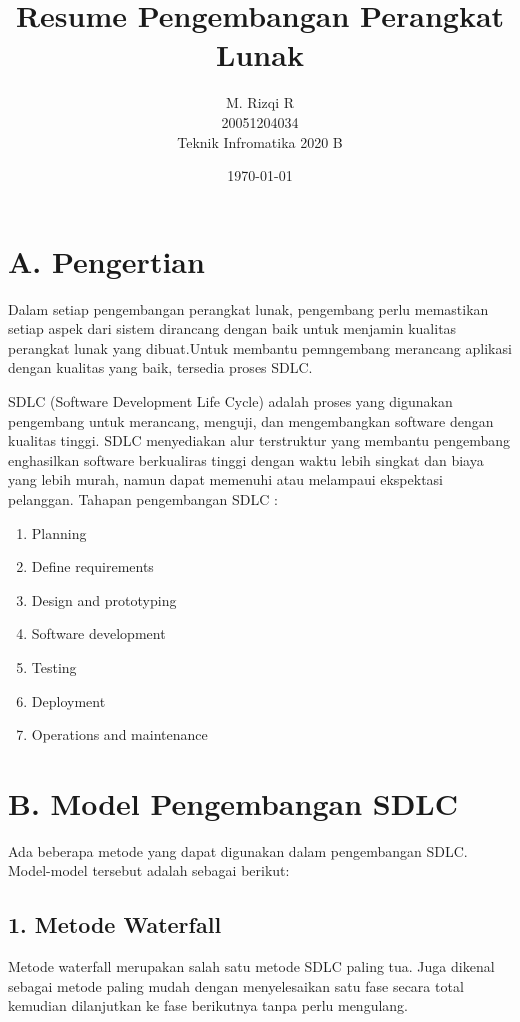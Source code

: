 \documentclass{article}
\title{\Large \textbf{\huge{Resume Pengembangan Perangkat Lunak}}}
\author{
    M. Rizqi R\\
    20051204034\\
    Teknik Infromatika 2020 B\\
}
\date{\today}
\begin{document}
    \maketitle
    \begin{multicols*}{2}
    \section*{A. Pengertian}
    Dalam setiap pengembangan perangkat lunak, pengembang perlu memastikan
    setiap aspek dari sistem dirancang dengan baik untuk menjamin kualitas
    perangkat lunak yang dibuat.Untuk membantu pemngembang merancang aplikasi dengan kualitas
    yang baik, tersedia proses SDLC.

    SDLC (Software Development Life Cycle) adalah proses yang digunakan
    pengembang untuk merancang, menguji, dan mengembangkan software dengan
    kualitas tinggi. SDLC menyediakan alur terstruktur yang membantu pengembang
    enghasilkan software berkualiras tinggi dengan waktu lebih singkat dan biaya yang
    lebih murah, namun dapat memenuhi atau melampaui ekspektasi pelanggan.
    Tahapan pengembangan SDLC :
    
    \begin{enumerate}
        \item Planning
        \item Define requirements
        \item Design and prototyping
        \item Software development
        \item Testing
        \item Deployment
        \item Operations and maintenance
    \end{enumerate}
    \section*{B. Model Pengembangan SDLC}
    Ada beberapa metode yang dapat digunakan dalam pengembangan SDLC. 
    Model-model tersebut adalah sebagai berikut:
    \subsection*{1. Metode Waterfall}
    Metode waterfall merupakan salah satu metode SDLC paling tua. Juga dikenal
    sebagai metode paling mudah dengan menyelesaikan satu fase secara total
    kemudian dilanjutkan ke fase berikutnya tanpa perlu mengulang.


\end{multicols*}
\end{document}
